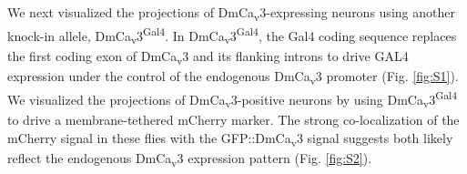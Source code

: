 We next visualized the projections of DmCa\textsubscript{v}3-expressing neurons using another knock-in allele, DmCa\textsubscript{v}3\textsuperscript{Gal4}.
In DmCa\textsubscript{v}3\textsuperscript{Gal4}, the Gal4 coding sequence replaces the first coding exon of DmCa\textsubscript{v}3 and its flanking introns to drive GAL4 expression under the control of the endogenous DmCa\textsubscript{v}3 promoter (Fig. \ref{fig:S1}).
We visualized the projections of DmCa\textsubscript{v}3-positive neurons by using DmCa\textsubscript{v}3\textsuperscript{Gal4} to drive a membrane-tethered mCherry marker.
The strong co-localization of the mCherry signal in these flies with the GFP::DmCa\textsubscript{v}3 signal suggests both likely reflect the endogenous DmCa\textsubscript{v}3 expression pattern (Fig. \ref{fig:S2}).
    
    
    
    
    
    
    
    
  
  
  
  
